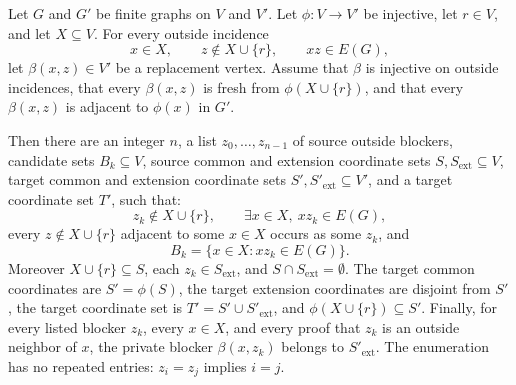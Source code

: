 \begin{helper}
Let \(G\) and \(G'\) be finite graphs on \(V\) and \(V'\).  Let
\(\phi:V\to V'\) be injective, let \(r\in V\), and let \(X\subseteq V\).
For every outside incidence
\[
  x\in X,\qquad z\notin X\cup\{r\},\qquad xz\in E(G),
\]
let \(\beta(x,z)\in V'\) be a replacement vertex.  Assume that \(\beta\) is
injective on outside incidences, that every \(\beta(x,z)\) is fresh from
\(\phi(X\cup\{r\})\), and that every \(\beta(x,z)\) is adjacent to
\(\phi(x)\) in \(G'\).

Then there are an integer \(n\), a list \(z_0,\ldots,z_{n-1}\) of source
outside blockers, candidate sets \(B_k\subseteq V\), source common and
extension coordinate sets \(S,S_{\mathrm{ext}}\subseteq V\), target common
and extension coordinate sets \(S',S'_{\mathrm{ext}}\subseteq V'\), and a
target coordinate set \(T'\), such that:
\[
z_k\notin X\cup\{r\},\qquad \exists x\in X,\ xz_k\in E(G),
\]
every \(z\notin X\cup\{r\}\) adjacent to some \(x\in X\) occurs as some
\(z_k\), and
\[
  B_k=\{x\in X:xz_k\in E(G)\}.
\]
Moreover \(X\cup\{r\}\subseteq S\), each \(z_k\in S_{\mathrm{ext}}\), and
\(S\cap S_{\mathrm{ext}}=\emptyset\).  The target common coordinates are
\(S'=\phi(S)\), the target extension coordinates are disjoint from \(S'\), the
target coordinate set is \(T'=S'\cup S'_{\mathrm{ext}}\), and
\(\phi(X\cup\{r\})\subseteq S'\).  Finally, for every listed blocker
\(z_k\), every \(x\in X\), and every proof that \(z_k\) is an outside
neighbor of \(x\), the private blocker \(\beta(x,z_k)\) belongs to
\(S'_{\mathrm{ext}}\).  The enumeration has no repeated entries:
\(z_i=z_j\) implies \(i=j\).
\end{helper}
